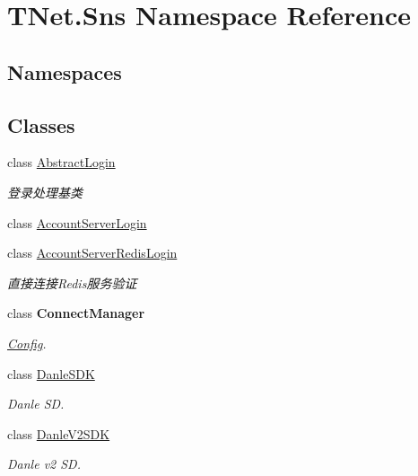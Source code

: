 \hypertarget{namespace_t_net_1_1_sns}{}\section{T\+Net.\+Sns Namespace Reference}
\label{namespace_t_net_1_1_sns}
\subsection*{Namespaces}
\begin{DoxyCompactItemize}
\end{DoxyCompactItemize}
\subsection*{Classes}
\begin{DoxyCompactItemize}
\item 
class \mbox{\hyperlink{class_t_net_1_1_sns_1_1_abstract_login}{Abstract\+Login}}
\begin{DoxyCompactList}\small\item\em 登录处理基类 \end{DoxyCompactList}\item 
class \mbox{\hyperlink{class_t_net_1_1_sns_1_1_account_server_login}{Account\+Server\+Login}}
\item 
class \mbox{\hyperlink{class_t_net_1_1_sns_1_1_account_server_redis_login}{Account\+Server\+Redis\+Login}}
\begin{DoxyCompactList}\small\item\em 直接连接\+Redis服务验证 \end{DoxyCompactList}\item 
class {\bfseries Connect\+Manager}
\begin{DoxyCompactList}\small\item\em \mbox{\hyperlink{namespace_t_net_1_1_config}{Config}}. \end{DoxyCompactList}\item 
class \mbox{\hyperlink{class_t_net_1_1_sns_1_1_danle_s_d_k}{Danle\+S\+DK}}
\begin{DoxyCompactList}\small\item\em Danle SD. \end{DoxyCompactList}\item 
class \mbox{\hyperlink{class_t_net_1_1_sns_1_1_danle_v2_s_d_k}{Danle\+V2\+S\+DK}}
\begin{DoxyCompactList}\small\item\em Danle v2 SD. \end{DoxyCompactList}\item 

\end{DoxyCompactItemize}

